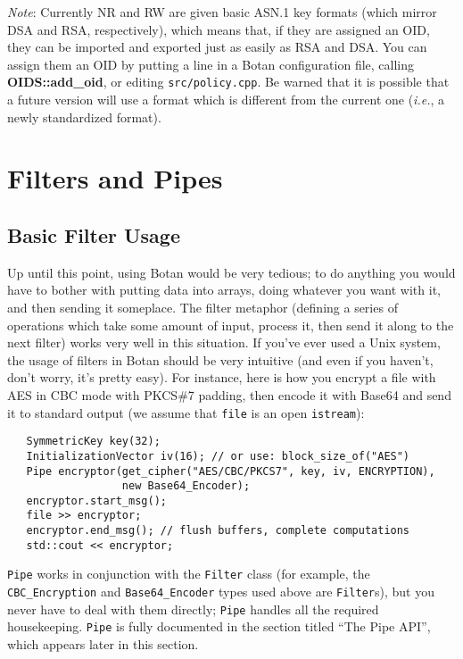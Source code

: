 \documentclass{article}
\newcommand{\filename}[1]{\texttt{#1}}
\newcommand{\function}[1]{\textbf{#1}}
\newcommand{\type}[1]{\texttt{#1}}
\newcommand{\ie}[0]{\emph{i.e.}}
\begin{document}
\emph{Note}: Currently NR and RW are given basic ASN.1 key formats (which
mirror DSA and RSA, respectively), which means that, if they are assigned an
OID, they can be imported and exported just as easily as RSA and DSA. You can
assign them an OID by putting a line in a Botan configuration file, calling
\function{OIDS::add\_oid}, or editing \filename{src/policy.cpp}. Be warned that
it is possible that a future version will use a format which is different from
the current one (\ie, a newly standardized format).

\pagebreak

\section{Filters and Pipes}

\subsection{Basic Filter Usage}

Up until this point, using Botan would be very tedious; to do anything you
would have to bother with putting data into arrays, doing whatever you want
with it, and then sending it someplace. The filter metaphor (defining a series
of operations which take some amount of input, process it, then send it along
to the next filter) works very well in this situation. If you've ever used a
Unix system, the usage of filters in Botan should be very intuitive (and even
if you haven't, don't worry, it's pretty easy). For instance, here is how you
encrypt a file with AES in CBC mode with PKCS\#7 padding, then encode it with
Base64 and send it to standard output (we assume that \verb|file| is an open
\type{istream}):

\begin{verbatim}
   SymmetricKey key(32);
   InitializationVector iv(16); // or use: block_size_of("AES")
   Pipe encryptor(get_cipher("AES/CBC/PKCS7", key, iv, ENCRYPTION),
                  new Base64_Encoder);
   encryptor.start_msg();
   file >> encryptor;
   encryptor.end_msg(); // flush buffers, complete computations
   std::cout << encryptor;
\end{verbatim}

\type{Pipe} works in conjunction with the \type{Filter} class (for example, the
\type{CBC\_Encryption} and \type{Base64\_Encoder} types used above are
\type{Filter}s), but you never have to deal with them directly; \type{Pipe}
handles all the required housekeeping. \type{Pipe} is fully documented in the
section titled ``The Pipe API'', which appears later in this section.
\end{document}
